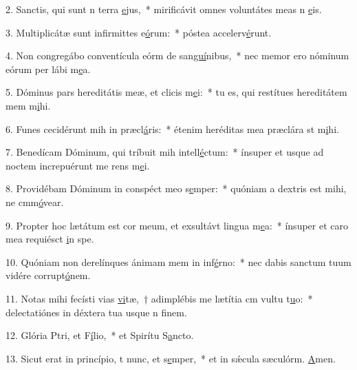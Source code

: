 2. Sanctis, qui sunt n terra \uline{e}jus,~* mirificávit omnes voluntátes meas n \uline{e}is.\par 
3. Multiplicátæ sunt infirmittes e\uline{ó}rum:~* póstea accelerv\uline{é}runt.\par 
4. Non congregábo conventícula eórm de san\uline{guí}nibus,~* nec memor ero nóminum eórum per lábi m\uline{e}a.\par 
5. Dóminus pars hereditátis meæ, et clicis m\uline{e}i:~* tu es, qui restítues hereditátem mem m\uline{i}hi.\par 
6. Funes cecidérunt mih in præcl\uline{á}ris:~* étenim heréditas mea præclára st m\uline{i}hi.\par 
7. Benedícam Dóminum, qui tríbuit mih intell\uline{é}ctum:~* ínsuper et usque ad noctem increpuérunt me rens m\uline{e}i.\par 
8. Providébam Dóminum in conspéct meo s\uline{e}mper:~* quóniam a dextris est mihi, ne cmm\uline{ó}vear.\par 
9. Propter hoc lætátum est cor meum, et exsultávt lingua m\uline{e}a:~* ínsuper et caro mea requiésct \uline{i}n spe.\par 
10. Quóniam non derelínques ánimam mem in inf\uline{é}rno:~* nec dabis sanctum tuum vidére corrupt\uline{ó}nem.\par 
11. Notas mihi fecísti vias \uline{vi}tæ,~† adimplébis me lætítia cm vultu t\uline{u}o:~* delectatiónes in déxtera tua usque n f\uline{i}nem.\par 
12. Glória Ptri, et F\uline{í}lio,~* et Spirítu S\uline{a}ncto.\par 
13. Sicut erat in princípio, t nunc, et s\uline{e}mper,~* et in sǽcula sæculórm. \uline{A}men.\par 
